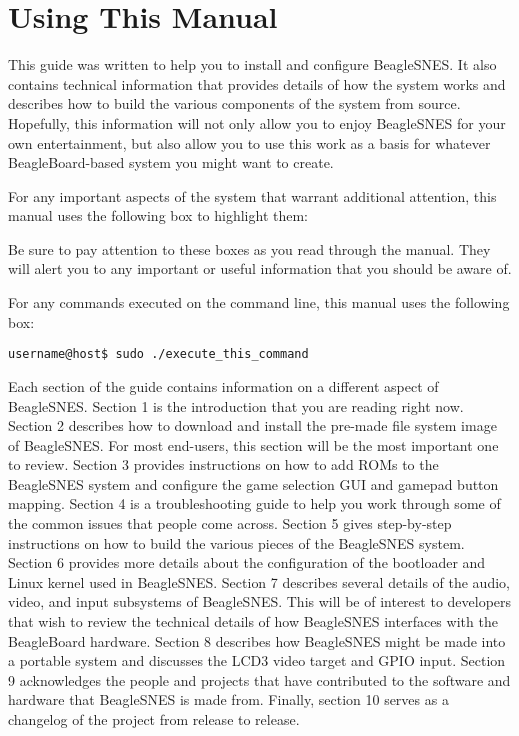 \section{Using This Manual}

This guide was written to help you to install and configure BeagleSNES.  It also contains technical information that provides details of how the system works and describes how to build the various components of the system from source.  Hopefully, this information will not only allow you to enjoy BeagleSNES for your own entertainment, but also allow you to use this work as a basis for whatever BeagleBoard-based system you might want to create.  

For any important aspects of the system that warrant additional attention, this manual uses the following box to highlight them:

\begin{updateWarn}
Be sure to pay attention to these boxes as you read through the manual.  They will alert you to any important or useful information that you should be aware of.
\end{updateWarn}

For any commands executed on the command line, this manual uses the following box:

\begin{commandBox}
\texttt{username@host\$  sudo ./execute\_this\_command}
\end{commandBox}

Each section of the guide contains information on a different aspect of BeagleSNES.  Section 1 is the introduction that you are reading right now.  Section 2 describes how to download and install the pre-made file system image of BeagleSNES.  For most end-users, this section will be the most important one to review.  Section 3 provides instructions on how to add ROMs to the BeagleSNES system and configure the game selection GUI and gamepad button mapping.  Section 4 is a troubleshooting guide to help you work through some of the common issues that people come across.  Section 5 gives step-by-step instructions on how to build the various pieces of the BeagleSNES system.  Section 6 provides more details about the configuration of the bootloader and Linux kernel used in BeagleSNES.  Section 7 describes several details of the audio, video, and input subsystems of BeagleSNES.  This will be of interest to developers that wish to review the technical details of how BeagleSNES interfaces with the BeagleBoard hardware.  Section 8 describes how BeagleSNES might be made into a portable system and discusses the LCD3 video target and GPIO input.  Section 9 acknowledges the people and projects that have contributed to the software and hardware that BeagleSNES is made from.  Finally, section 10 serves as a changelog of the project from release to release.

